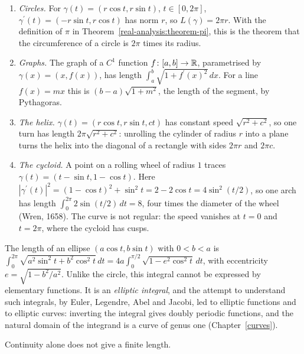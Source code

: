 \begin{example}\label{real-analysis:example-lengths}
\begin{enumerate}
\item \emph{Circles.} For $\gamma(t) = (r\cos t, r\sin t)$, $t \in [0, 2\pi]$, $\gamma^{\prime}(t) = (-r\sin t, r\cos t)$ has norm $r$, so $L(\gamma) = 2\pi r$. With the definition of $\pi$ in
Theorem~\ref{real-analysis:theorem-pi}, this is the theorem that the circumference of a circle is $2\pi$ times its radius.
\item \emph{Graphs.} The graph of a $C^1$ function $f \colon [a, b] \to \mathbb{R}$, parametrised by $\gamma(x) = (x, f(x))$, has length $\int_a^b\sqrt{1 + f^{\prime}(x)^2}\,dx$. For a line $f(x) = mx$ this is
$(b - a)\sqrt{1 + m^2}$, the length of the segment, by Pythagoras.
\item \emph{The helix.} $\gamma(t) = (r\cos t, r\sin t, ct)$ has constant speed $\sqrt{r^2 + c^2}$, so one turn has length $2\pi\sqrt{r^2 + c^2}$: unrolling the cylinder of radius $r$ into a plane turns the helix
into the diagonal of a rectangle with sides $2\pi r$ and $2\pi c$.
\item \emph{The cycloid.} A point on a rolling wheel of radius $1$ traces $\gamma(t) = (t - \sin t, 1 - \cos t)$. Here $|\gamma^{\prime}(t)|^2 = (1 - \cos t)^2 + \sin^2t = 2 - 2\cos t = 4\sin^2(t/2)$, so one arch has length
$\int_0^{2\pi}2\sin(t/2)\,dt = 8$, four times the diameter of the wheel (Wren, 1658). The curve is not regular: the speed vanishes at $t = 0$ and $t = 2\pi$, where the cycloid has cusps.
\end{enumerate}
\end{example}

\begin{remark}\label{real-analysis:remark-elliptic-integrals}
The length of an ellipse $(a\cos t, b\sin t)$ with $0 < b < a$ is $\int_0^{2\pi}\sqrt{a^2\sin^2t + b^2\cos^2t}\,dt = 4a\int_0^{\pi/2}\sqrt{1 - e^2\cos^2t}\,dt$, with eccentricity $e = \sqrt{1 - b^2/a^2}$. Unlike
the circle, this integral cannot be expressed by elementary functions. It is an \emph{elliptic integral}, and the attempt to understand such integrals, by Euler, Legendre, Abel and Jacobi, led to elliptic
functions and to elliptic curves: inverting the integral gives doubly periodic functions, and the natural domain of the integrand is a curve of genus one (Chapter~\ref{curves}).
\end{remark}

Continuity alone does not give a finite length.

